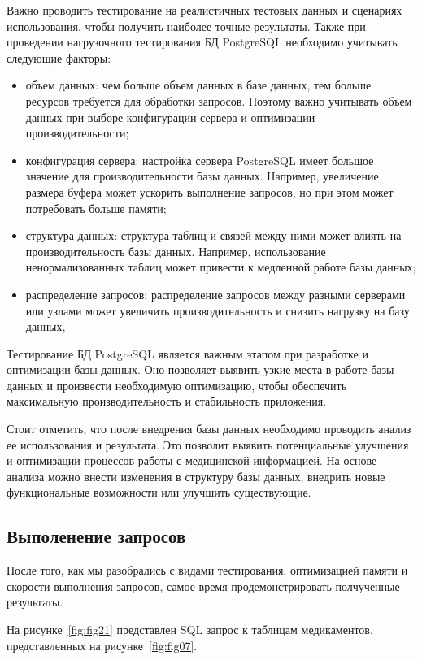 Важно проводить тестирование на реалистичных тестовых данных и сценариях использования, чтобы получить наиболее точные результаты. Также при проведении нагрузочного тестирования БД PostgreSQL необходимо учитывать следующие факторы:

\begin{itemize}
    \item объем данных: чем больше объем данных в базе данных, тем больше ресурсов требуется для обработки запросов. Поэтому важно учитывать объем данных при выборе конфигурации сервера и оптимизации производительности;
    \item конфигурация сервера: настройка сервера PostgreSQL имеет большое значение для производительности базы данных. Например, увеличение размера буфера может ускорить выполнение запросов, но при этом может потребовать больше памяти;
    \item структура данных: структура таблиц и связей между ними может влиять на производительность базы данных. Например, использование ненормализованных таблиц может привести к медленной работе базы данных;
    \item распределение запросов: распределение запросов между разными серверами или узлами может увеличить производительность и снизить нагрузку на базу данных,
\end{itemize}

Тестирование БД PostgreSQL является важным этапом при разработке и оптимизации базы данных. Оно позволяет выявить узкие места в работе базы данных и произвести необходимую оптимизацию, чтобы обеспечить максимальную производительность и стабильность приложения.

Стоит отметить, что после внедрения базы данных необходимо проводить анализ ее использования и результата. Это позволит выявить потенциальные улучшения и оптимизации процессов работы с медицинской информацией. На основе анализа можно внести изменения в структуру базы данных, внедрить новые функциональные возможности или улучшить существующие.



\subsection{Выполенение запросов}

После того, как мы разобрались с видами тестирования, оптимизацией памяти и скорости выполнения запросов, самое время продемонстрировать полчученные результаты.

На рисунке~\ref{fig:fig21} представлен SQL запрос к таблицам медикаментов, представленных на рисунке~\ref{fig:fig07}.

